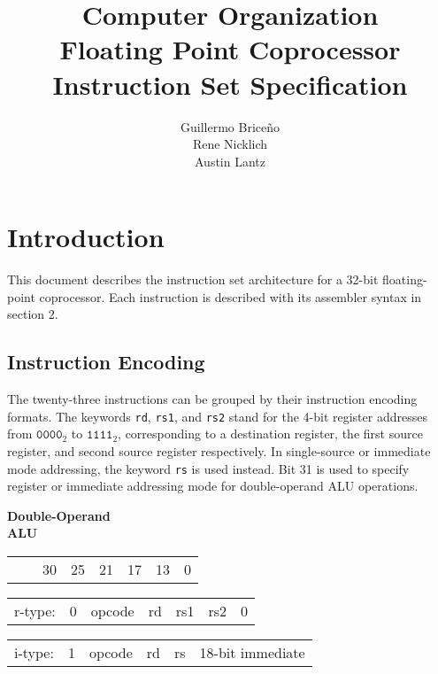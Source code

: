 \documentclass{article}
\title{
	\vspace{2in}
	\textmd{Computer Organization \\ Floating Point Coprocessor}\\
	\vspace{1cm}
	\textmd{\textbf{Instruction Set Specification}}
	\vspace{5cm}
}
\author{Guillermo Brice\~{n}o \\ Rene Nicklich \\ Austin Lantz}
\begin{document}
\maketitle

\pagebreak

\section{Introduction}
This document describes the instruction set architecture for a 32-bit floating-point coprocessor. Each instruction is described with its assembler syntax in section 2.\\

\subsection{Instruction Encoding}
The twenty-three instructions can be grouped by their instruction encoding formats. The keywords \texttt{rd}, \texttt{rs1}, and \texttt{rs2} stand for the 4-bit register addresses from $\texttt{0000}_2$ to $\texttt{1111}_2$, corresponding to a destination register, the first source register, and second source register respectively. In single-source or immediate mode addressing, the keyword \texttt{rs} is used instead. Bit 31 is used to specify register or immediate addressing mode for double-operand ALU operations.

\normalsize
\bigskip

\begin{minipage}[t]{0.3\textwidth}
	\begin{center}
		\medskip
		\textbf{Double-Operand\\ ALU}
	\end{center}
\end{minipage}
\begin{minipage}[t]{110mm}
	\begin{tabular}{p{12mm}p{2.5mm}p{13mm}p{10mm}p{10mm}p{10mm}p{22.5mm}R{22.5mm}}
		& \footnotesize{} & \footnotesize{30} & \footnotesize{25} & \footnotesize{21} & \footnotesize{17} & \footnotesize{13} & \footnotesize{0} \\ 
	\end{tabular} 

	\begin{tabular}{p{12mm}|C{2.5mm}|C{12.5mm}|C{10mm}|C{10mm}|C{10mm}|C{45mm}|}
		r-type: & 0 & opcode & rd & rs1 & rs2 & 0\\ 
	\end{tabular} 
	
	\medskip

	\begin{tabular}{p{12mm}|C{2.5mm}|C{12.5mm}|C{10mm}|C{10mm}|C{55.15mm}|}
		i-type: & 1 & opcode & rd & rs & 18-bit immediate \\
	\end{tabular}
\end{minipage}
\end{document}
